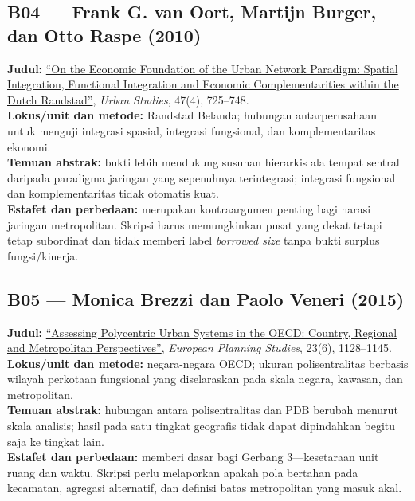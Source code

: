\documentclass[
  indonesian,
  11pt,
  a4paper,
  oneside,
  openany]{report}
\begin{document}
\subsection{B04 --- Frank G. van Oort, Martijn Burger, dan Otto Raspe
(2010)}\label{b04-frank-g.-van-oort-martijn-burger-dan-otto-raspe-2010}

\textbf{Judul:} \href{https://doi.org/10.1177/0042098009352362}{``On the
Economic Foundation of the Urban Network Paradigm: Spatial Integration,
Functional Integration and Economic Complementarities within the Dutch
Randstad''}, \emph{Urban Studies}, 47(4), 725--748.\\
\textbf{Lokus/unit dan metode:} Randstad Belanda; hubungan
antarperusahaan untuk menguji integrasi spasial, integrasi fungsional,
dan komplementaritas ekonomi.\\
\textbf{Temuan abstrak:} bukti lebih mendukung susunan hierarkis ala
tempat sentral daripada paradigma jaringan yang sepenuhnya terintegrasi;
integrasi fungsional dan komplementaritas tidak otomatis kuat.\\
\textbf{Estafet dan perbedaan:} merupakan kontraargumen penting bagi
narasi jaringan metropolitan. Skripsi harus memungkinkan pusat yang
dekat tetapi tetap subordinat dan tidak memberi label \emph{borrowed
size} tanpa bukti surplus fungsi/kinerja.

\subsection{B05 --- Monica Brezzi dan Paolo Veneri
(2015)}\label{b05-monica-brezzi-dan-paolo-veneri-2015}

\textbf{Judul:}
\href{https://doi.org/10.1080/09654313.2014.905005}{``Assessing
Polycentric Urban Systems in the OECD: Country, Regional and
Metropolitan Perspectives''}, \emph{European Planning Studies}, 23(6),
1128--1145.\\
\textbf{Lokus/unit dan metode:} negara-negara OECD; ukuran
polisentralitas berbasis wilayah perkotaan fungsional yang diselaraskan
pada skala negara, kawasan, dan metropolitan.\\
\textbf{Temuan abstrak:} hubungan antara polisentralitas dan PDB berubah
menurut skala analisis; hasil pada satu tingkat geografis tidak dapat
dipindahkan begitu saja ke tingkat lain.\\
\textbf{Estafet dan perbedaan:} memberi dasar bagi Gerbang
3---kesetaraan unit ruang dan waktu. Skripsi perlu melaporkan apakah
pola bertahan pada kecamatan, agregasi alternatif, dan definisi batas
metropolitan yang masuk akal.
\end{document}
